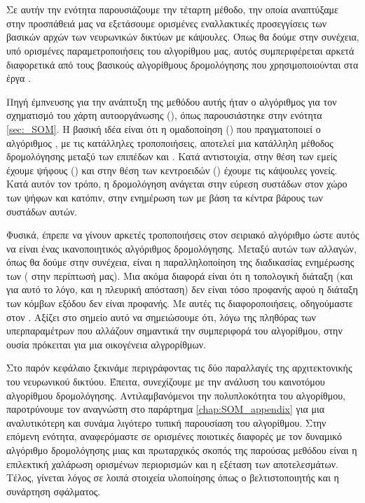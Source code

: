\section{}

Σε αυτήν την ενότητα παρουσιάζουμε την τέταρτη μέθοδο, την οποία αναπτύξαμε στην προσπάθειά μας να εξετάσουμε ορισμένες εναλλακτικές προσεγγίσεις των βασικών αρχών των νευρωνικών δικτύων με κάψουλες. Όπως θα δούμε στην συνέχεια, υπό ορισμένες παραμετροποιήσεις του αλγορίθμου μας, αυτός συμπεριφέρεται αρκετά διαφορετικά από τους βασικούς αλγορίθμους δρομολόγησης που χρησιμοποιούνται στα έργα \cite{sabour2017dynamic,hinton2018matrix}.\par

Πηγή έμπνευσης για την ανάπτυξη της μεθόδου αυτής ήταν ο αλγόριθμος για τον σχηματισμό του χάρτη αυτο\textendash οργάνωσης (), όπως παρουσιάστηκε στην ενότητα \ref{sec:_SOM}. Η βασική ιδέα είναι ότι η ομαδοποίηση () που πραγματοποιεί ο αλγόριθμος , με τις κατάλληλες τροποποιήσεις, αποτελεί μια κατάλληλη μέθοδος δρομολόγησης μεταξύ των επιπέδων  και . Κατά αντιστοιχία, στην θέση των  εμείς έχουμε ψήφους () και στην θέση των κεντροειδών () έχουμε τις κάψουλες γονείς. Κατά αυτόν τον τρόπο, η δρομολόγηση ανάγεται στην εύρεση συστάδων στον χώρο των ψήφων και κατόπιν, στην ενημέρωση των  με βάση τα κέντρα βάρους των συστάδων αυτών.\par

Φυσικά, έπρεπε να γίνουν αρκετές τροποποιήσεις στον σειριακό αλγόριθμο  ώστε αυτός να είναι ένας ικανοποιητικός αλγόριθμος δρομολόγησης. Μεταξύ αυτών των αλλαγών, όπως θα δούμε στην συνέχεια, είναι η παραλληλοποίηση της διαδικασίας ενημέρωσης των  ( στην περίπτωσή μας). Μια ακόμα διαφορά είναι ότι η τοπολογική διάταξη (και για αυτό το λόγο, και η πλευρική απόσταση) δεν είναι τόσο προφανής αφού η διάταξη των κόμβων εξόδου δεν είναι προφανής. Με αυτές τις διαφοροποιήσεις, οδηγούμαστε στον . Αξίζει στο σημείο αυτό να σημειώσουμε ότι, λόγω της πληθόρας των υπερπαραμέτρων που αλλάζουν σημαντικά την συμπεριφορά του αλγορίθμου, στην ουσία πρόκειται για μια οικογένεια αλγρορίθμων.\par

Στο παρόν κεφάλαιο ξεκινάμε περιγράφοντας τις δύο παραλλαγές της αρχιτεκτονικής του νευρωνικού δικτύου. Έπειτα, συνεχίζουμε με την ανάλυση του καινοτόμου αλγορίθμου δρομολόγησης. Αντιλαμβανόμενοι την πολυπλοκότητα του αλγορίθμου, παροτρύνουμε τον αναγνώστη στο παράρτημα \ref{chap:SOM_appendix} για μια αναλυτικότερη και συνάμα λιγότερο τυπική παρουσίαση του αλγορίθμου. Στην επόμενη ενότητα, αναφερόμαστε σε ορισμένες ποιοτικές διαφορές με τον δυναμικό αλγόριθμο δρομολόγησης μιας και πρωταρχικός σκοπός της παρούσας μεθόδου είναι η επιλεκτική χαλάρωση ορισμένων περιορισμών και η εξέταση των αποτελεσμάτων. Τέλος, γίνεται λόγος σε λοιπά στοιχεία υλοποίησης όπως ο βελτιστοποιητής και η συνάρτηση σφάλματος. 

